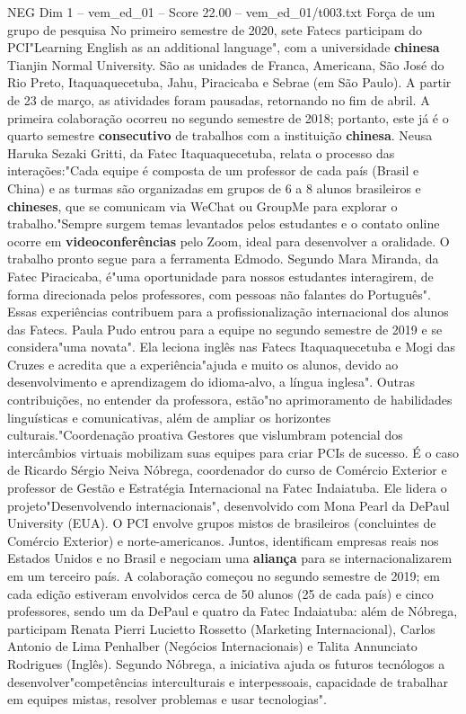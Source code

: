 \begin{textsample}{NEG Dim 1 – vem\_ed\_01 – Score 22.00 – vem\_ed\_01/t003.txt}  \label{ex:f1_neg_097}
Força de um grupo de pesquisa No primeiro semestre de 2020, sete Fatecs participam do PCI"Learning English as an additional language", com a universidade \textbf{chinesa} Tianjin Normal University.
São as unidades de Franca, Americana, São José do Rio Preto, Itaquaquecetuba, Jahu, Piracicaba e Sebrae (em São Paulo).
A partir de 23 de março, as atividades foram pausadas, retornando no fim de abril.
A primeira colaboração ocorreu no segundo semestre de 2018; portanto, este já é o quarto semestre \textbf{consecutivo} de trabalhos com a instituição \textbf{chinesa}.
Neusa Haruka Sezaki Gritti, da Fatec Itaquaquecetuba, relata o processo das interações:"Cada equipe é composta de um professor de cada país (Brasil e China) e as turmas são organizadas em grupos de 6 a 8 alunos brasileiros e \textbf{chineses}, que se comunicam via WeChat ou GroupMe para explorar o trabalho."Sempre surgem temas levantados pelos estudantes e o contato online ocorre em \textbf{videoconferências} pelo Zoom, ideal para desenvolver a oralidade.
O trabalho pronto segue para a ferramenta Edmodo.
Segundo Mara Miranda, da Fatec Piracicaba, é"uma oportunidade para nossos estudantes interagirem, de forma direcionada pelos professores, com pessoas não falantes do Português".
Essas experiências contribuem para a profissionalização internacional dos alunos das Fatecs.
Paula Pudo entrou para a equipe no segundo semestre de 2019 e se considera"uma novata".
Ela leciona inglês nas Fatecs Itaquaquecetuba e Mogi das Cruzes e acredita que a experiência"ajuda e muito os alunos, devido ao desenvolvimento e aprendizagem do idioma-alvo, a língua inglesa".
Outras contribuições, no entender da professora, estão"no aprimoramento de habilidades linguísticas e comunicativas, além de ampliar os horizontes culturais."Coordenação proativa Gestores que vislumbram potencial dos intercâmbios virtuais mobilizam suas equipes para criar PCIs de sucesso.
É o caso de Ricardo Sérgio Neiva Nóbrega, coordenador do curso de Comércio Exterior e professor de Gestão e Estratégia Internacional na Fatec Indaiatuba.
Ele lidera o projeto"Desenvolvendo internacionais", desenvolvido com Mona Pearl da DePaul University (EUA).
O PCI envolve grupos mistos de brasileiros (concluintes de Comércio Exterior) e norte-americanos.
Juntos, identificam empresas reais nos Estados Unidos e no Brasil e negociam uma \textbf{aliança} para se internacionalizarem em um terceiro país.
A colaboração começou no segundo semestre de 2019; em cada edição estiveram envolvidos cerca de 50 alunos (25 de cada país) e cinco professores, sendo um da DePaul e quatro da Fatec Indaiatuba: além de Nóbrega, participam Renata Pierri Lucietto Rossetto (Marketing Internacional), Carlos Antonio de Lima Penhalber (Negócios Internacionais) e Talita Annunciato Rodrigues (Inglês).
Segundo Nóbrega, a iniciativa ajuda os futuros tecnólogos a desenvolver"competências interculturais e interpessoais, capacidade de trabalhar em equipes mistas, resolver problemas e usar tecnologias".

\end{textsample}
